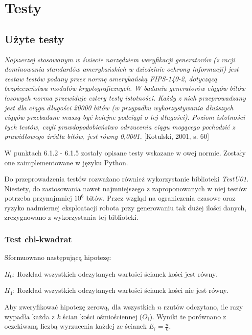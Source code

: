 \chapter{Testy}

\section{Użyte testy}

\textit{Najszerzej stosowanym w świecie narzędziem weryfikacji generatorów
(z racji dominowania standardów amerykańskich w dziedzinie ochrony informacji) jest zestaw testów podany przez normę 
amerykańską FIPS-140-2, dotyczącą bezpieczeństwa modułów kryptograficznych. W badaniu generatorów ciągów bitów losowych 
norma przewiduje cztery testy istotności. Każdy z nich przeprowadzany jest dla ciągu długości 20000 bitów (w przypadku 
wykorzystywania dłuższych ciągów przebadane muszą być kolejne podciągi o tej długości). Poziom istotności tych testów, 
czyli prawdopodobieństwo odrzucenia ciągu mogącego pochodzić z prawidłowego źródła bitów, jest równy 0,0001.}
[Kotulski, 2001, s. 60] \par
W punktach 6.1.2 - 6.1.5 zostały opisane testy wskazane w owej normie. Zostały one zaimplementowane w języku Python.
\par
Do przeprowadzenia testów rozważano również wykorzystanie biblioteki \textit{TestU01}. Niestety, do zastosowania nawet 
najmniejszego z zaproponowanych w niej testów potrzeba przynajmniej \begin{math} 10^6 \end{math} bitów. Przez 
wzgląd na ograniczenia czasowe oraz ryzyko nadmiernej eksploatacji robota przy generowaniu tak dużej ilości danych, 
zrezygnowano z wykorzystania tej biblioteki.


\subsection{Test chi-kwadrat}
Sformuowano następującą hipotezę:
\par \begin{math} H_0 \end{math}: Rozkład wszystkich odczytanych wartości ścianek kości jest równy.
\par \begin{math} H_1 \end{math}: Rozkład wszystkich odczytanych wartości ścianek kości nie jest równy.
\par Aby zweryfikować hipotezę zerową, dla wszystkich \begin{math} n \end{math} rzutów odczytano, ile razy wypadła każda z 
\begin{math} k \end{math} ścian kości ośmiościennej (\begin{math}O_i\end{math}). Wyniki te porównano z oczekiwaną
liczbą wyrzucenia każdej ze ścianek \begin{math}E_i = \frac{n}{k}\end{math}. 

